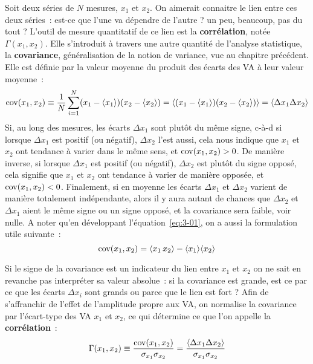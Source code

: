 Soit deux séries de $N$ mesures, $x_1$ et $x_2$. On aimerait connaitre le lien entre ces deux séries~: est-ce que l'une va dépendre de l'autre ? un peu, beaucoup, pas du tout ? L'outil de mesure quantitatif de ce lien est la \textbf{corrélation}, notée $\Gamma(x_1,x_2)$. Elle s'introduit à travers une autre quantité de l'analyse statistique, la \textbf{covariance}, généralisation de la notion de variance, vue au chapitre précédent. Elle est définie par la valeur moyenne du produit des écarts des VA à leur valeur moyenne~:
\begin{equation}
\text{cov}(x_1,x_2)\equiv\frac{1}{N}\sum\limits_{i=1}^{N}(x_1-\langle x_1\rangle)(x_2-\langle x_2\rangle)
=\langle (x_1-\langle x_1\rangle)(x_2-\langle x_2\rangle)\rangle
=\langle\Delta x_1\Delta x_2\rangle
\label{eq:3-01}
\end{equation}
Si, au long des mesures, les écarts $\Delta x_1$ sont plutôt du même signe, c-à-d si lorsque $\Delta x_1$ est positif (ou négatif), $\Delta x_2$ l'est aussi, cela nous indique que $x_1$ et $x_2$ ont tendance à varier dans le même sens, et $\text{cov}(x_1,x_2)>0$. De manière inverse, si lorsque $\Delta x_1$ est positif (ou négatif), $\Delta x_2$ est plutôt du signe opposé, cela signifie que $x_1$ et $x_2$ ont tendance à varier de manière opposée, et $\text{cov}(x_1,x_2)<0$. Finalement, si en moyenne les écarts $\Delta x_1$ et $\Delta x_2$ varient de manière totalement indépendante, alors il y aura autant de chances que $\Delta x_2$ et $\Delta x_1$ aient le même signe ou un signe opposé, et la covariance sera faible, voir nulle. A noter qu'en développant l'équation~\ref{eq:3-01}, on a aussi la formulation utile suivante~:
\begin{equation}
\text{cov}(x_1,x_2)=\langle x_1\, x_2\rangle-\langle x_1\rangle\langle x_2\rangle
\label{eq:3-02}
\end{equation}

Si le signe de la covariance est un indicateur du lien entre $x_1$ et $x_2$ on ne sait en revanche pas interpréter sa valeur absolue~: si la covariance est grande, est ce par ce que les écarts $\Delta x_i$ sont grands ou parce que le lien est fort ? Afin de s'affranchir de l'effet de l'amplitude propre aux VA, on normalise la covariance par l'écart-type des VA $x_1$ et $x_2$, ce qui détermine ce que l'on appelle la \textbf{corrélation}~:
\begin{equation}
\Gamma(x_1,x_2)\equiv\frac{\text{cov}(x_1,x_2)}{\sigma_{x_1}\sigma_{x_2}}
=\frac{\langle\Delta x_1\Delta x_2\rangle}{\sigma_{x_1}\sigma_{x_2}}
\end{equation}

